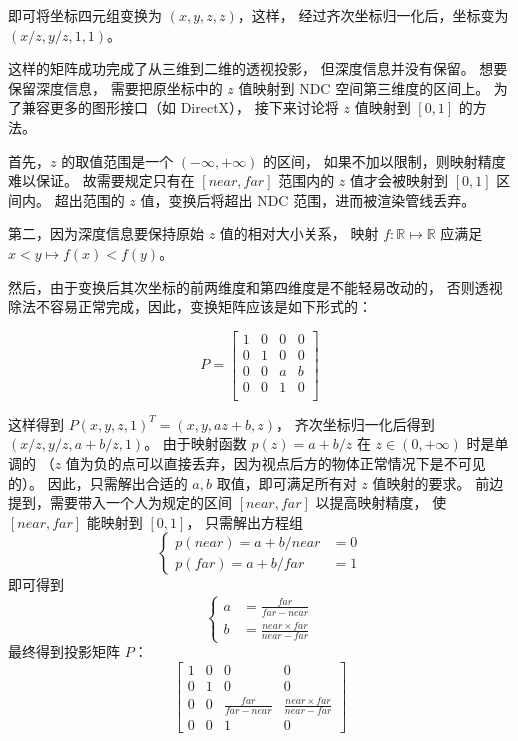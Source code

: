 \documentclass[fontset=windows]{ctexart}
\begin{document}
即可将坐标四元组变换为 $(x, y, z, z)$，这样，
经过齐次坐标归一化后，坐标变为 $(x/z, y/z, 1, 1)$。

这样的矩阵成功完成了从三维到二维的透视投影，
但深度信息并没有保留。
想要保留深度信息，
需要把原坐标中的 $z$ 值映射到 NDC 空间第三维度的区间上。
为了兼容更多的图形接口（如 DirectX），
接下来讨论将 $z$ 值映射到 $[0, 1]$ 的方法。

首先，$z$ 的取值范围是一个 $(-\infty, +\infty)$ 的区间，
如果不加以限制，则映射精度难以保证。
故需要规定只有在 $[near,far]$ 范围内的 $z$ 值才会被映射到 $[0, 1]$ 区间内。
超出范围的 $z$ 值，变换后将超出 NDC 范围，进而被渲染管线丢弃。

第二，因为深度信息要保持原始 $z$ 值的相对大小关系，
映射 $f:\mathbb{R}\mapsto\mathbb{R}$ 应满足
$x<y\mapsto f(x)<f(y)$。

然后，由于变换后其次坐标的前两维度和第四维度是不能轻易改动的，
否则透视除法不容易正常完成，因此，变换矩阵应该是如下形式的：

$$
P=\left[
\begin{matrix}
    1&0&0&0\\
    0&1&0&0\\
    0&0&a&b\\
    0&0&1&0\\
\end{matrix}
\right]
$$

这样得到 $P\left(x, y, z, 1\right)^T=\left(x,y,az+b,z\right)$，
齐次坐标归一化后得到 $\left(x/z, y/z, a+b/z, 1\right)$。
由于映射函数 $p(z)=a+b/z$ 在 $z\in(0,+\infty)$ 时是单调的
（$z$ 值为负的点可以直接丢弃，因为视点后方的物体正常情况下是不可见的）。
因此，只需解出合适的 $a, b$ 取值，即可满足所有对 $z$ 值映射的要求。
前边提到，需要带入一个人为规定的区间 $[near,far]$ 以提高映射精度，
使 $[near, far]$ 能映射到 $[0, 1]$，
只需解出方程组
$$\left\{
    \begin{array}{ll}
        p(near)=a+b/near&=0\\
        p(far)=a+b/far&=1
    \end{array}
\right.$$
即可得到 $$
\left\{
    \begin{array}{ll}
        a&=\frac{far}{far-near}\\
        b&=\frac{near\times far}{near-far}
    \end{array}
\right.$$
最终得到投影矩阵 $P$：
$$
\left[
    \begin{matrix}
        1&0&0&0\\
        0&1&0&0\\
        0&0&\frac{far}{far-near}&\frac{near\times far}{near-far}\\
        0&0&1&0
    \end{matrix}
\right]
$$
\end{document}
